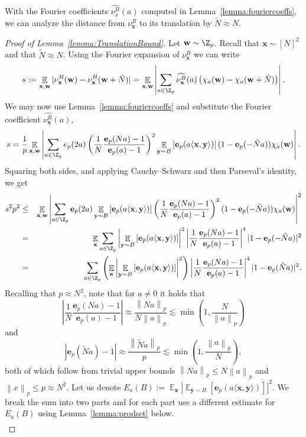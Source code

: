 \documentclass{toc}
\DeclareMathOperator{\Ex}{{\mathbb E}}
\newcommand{\e}{\mathbf{e}}
\newcommand{\x}{\mathbf{x}}
\newcommand{\y}{\mathbf{y}}
\newcommand{\w}{\mathbf{w}}
\newcommand{\ip}[1]{\langle #1 \rangle}
\newcommand{\norm}[1]{\left\| #1 \right\|_p}
\begin{document}
With the Fourier coefficients $\widehat{\nu^B_x}(a)$ computed in Lemma~\ref{lemma:fouriercoeffs}, we can analyze the distance from $\nu^B_\x$ to its translation by $\tilde{N} \approx N$.

\begin{proof}[Proof of Lemma~\ref{lemma:TranslationBound}]
Let $\w \sim \Z_p$. Recall that $\x \sim [N]^2$ and that $\tilde{N} \approx N$.
Using the Fourier expansion of $\nu_{\x}^B$ we can write
	$$ s := \Ex_{\x,\w} |\nu_{\x}^B(\w) -\nu_{\x}^B(\w+\tilde{N})| = \Ex_{\x,\w} \left| \sum_{a\in \Z_p} \widehat{\nu^B_\x}(a) \left(\chi_a(\w)-\chi_a(\w+\tilde{N}) \right) \right|.$$
	We may now use Lemma~\ref{lemma:fouriercoeffs} and substitute the Fourier coefficient $\widehat{\nu^B_\x}(a)$,
	$$
		s =    \frac{1}{p} \Ex_{\x,\w}  \left|\sum_{a\in \Z_p}
 e_p(2a)  \left(\frac{1}{N} \frac{\e_p(Na)-1}{\e_p(a)-1}\right)^2 \Ex_{\y \sim B}   \left[ \e_p(a\ip{\x,\y})\right] (1-\e_p(-\tilde{N}a))\chi_a(\w)  \right|.
  $$
  Squaring both sides, and applying Cauchy--Schwarz and then Parseval's identity, we get
  \begin{eqnarray*}
	  s^2p^2 &\le&    \Ex_{\x,\w}  \left|\sum_{a\in \Z_p} \e_p(2a) \Ex_{\y \sim B}   \left[ \e_p(a\ip{\x,\y})\right]\left(\frac{1}{N} \frac{\e_p(Na)-1}{\e_p(a)-1}\right)^2 (1-\e_p(-\tilde{N}a))\chi_a(\w)\right|^2 \nonumber \\
	  &=&  \Ex_\x \sum_{a\in \Z_p}  \left|\Ex_{\y \sim B}   \left[ \e_p(a\ip{\x,\y})\right]\right|^2 \left|\frac{1}{N} \frac{\e_p(Na)-1}{\e_p(a)-1}\right|^4 |1-\e_p(-\tilde{N}a)|^2 \nonumber  \\
	  &=&  \sum_{a\in \Z_p}  \left( \Ex_\x  \left|\Ex_{\y \sim B}   \left[ \e_p(a\ip{\x,\y})\right]\right|^2\right) \left|\frac{1}{N} \frac{\e_p(Na)-1}{\e_p(a)-1}\right|^4 |1-\e_p(\tilde{N}a)|^2 \label{eq:main}.
  \end{eqnarray*}
  Recalling that $p \approx N^2$, note that for $a \neq 0$ it holds that
	$$\left|\frac{1}{N} \frac{\e_p(Na)-1}{\e_p(a)-1}\right| \approx \frac{\norm{Na}}{N\norm{a}}\lesssim \min\left(1, \frac{N}{\norm{a}}\right)$$
 and
	$$ |\e_p(\tilde{N}a)-1| \approx \frac{\norm{\tilde{N}a}}{p}\lesssim \min \left(1, \frac{\norm{a}}{N}\right), $$
	both of which follow from trivial upper bounds $\norm{Na} \leq N\norm{a}$ and $\norm{x}\leq p \approx N^2$.
	 Let us denote $ E_a(B) :=   \Ex_\x  \left|\Ex_{\y \sim B}   \left[ \e_p(a\ip{\x,\y})\right]\right|^2$.
	 We break  the sum into two parts and for each part use a different estimate for $ E_a(B)$ using Lemma~\ref{lemma:prodset} below.
 \begin{eqnarray*}

\end{eqnarray*}
\end{proof}
\end{document}
